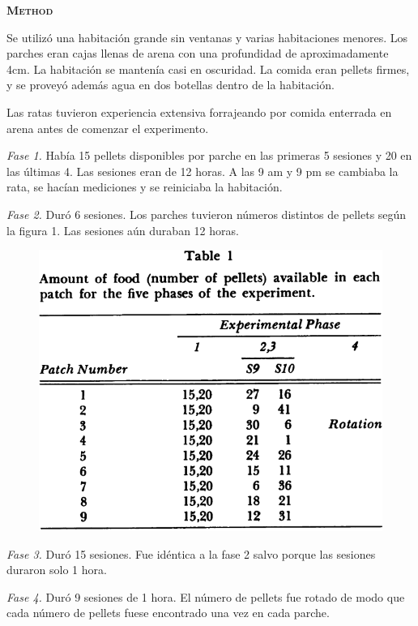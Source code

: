 \documentclass[a4paper,12pt]{article}
\begin{document}
{\scshape\bfseries Method}

Se utilizó una habitación grande sin ventanas y varias habitaciones menores. Los parches eran cajas llenas de arena con una profundidad de aproximadamente 4cm. La habitación se mantenía casi en oscuridad. La comida eran pellets firmes, y se proveyó además agua en dos botellas dentro de la habitación.

Las ratas tuvieron experiencia extensiva forrajeando por comida enterrada en arena antes de comenzar el experimento.

{\itshape Fase 1.} Había 15 pellets disponibles por parche en las primeras 5 sesiones y 20 en las últimas 4. Las sesiones eran de 12 horas. A las 9 am y 9 pm se cambiaba la rata, se hacían mediciones y se reiniciaba la habitación.

{\itshape Fase 2.} Duró 6 sesiones. Los parches tuvieron números distintos de pellets según la figura 1. Las sesiones aún duraban 12 horas. 

\begin{figure}[hb]
	\begin{center}
		\includegraphics[scale=0.5]{Mellgren1982(1).png}
	\end{center}	
\end{figure}

{\itshape Fase 3.} Duró 15 sesiones. Fue idéntica a la fase 2 salvo porque las sesiones duraron solo 1 hora.

{\itshape Fase 4.} Duró 9 sesiones de 1 hora. El número de pellets fue rotado de modo que cada número de pellets fuese encontrado una vez en cada parche. 
\end{document}
